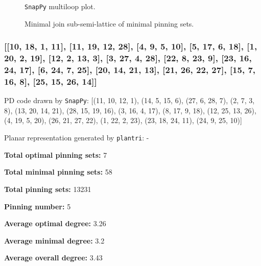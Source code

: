 \documentclass{article}%
\begin{document}
\begin{multicols}{2}
\begin{figure}[H]
\centering

\caption{\texttt{SnapPy} multiloop plot.}
\label{fig:tex/img/[[10, 18, 1, 11], [11, 19, 12, 28], [9, 27, 10, 28], [5, 17, 6, 18], [1, 6, 2, 7], [19, 7, 20, 8], [12, 8, 13, 9], [21, 26, 22, 27], [22, 4, 23, 5], [23, 16, 24, 17], [2, 24, 3, 25], [20, 14, 21, 13],.svg}
\end{figure}
\columnbreak

\begin{figure}[H]
\centering
\scalebox{0.8}{}
\caption{Minimal join sub-semi-lattice of minimal pinning sets.}
\label{fig:tex/img/[[10, 18, 1, 11], [11, 19, 12, 28], [9, 27, 10, 28], [5, 17, 6, 18], [1, 6, 2, 7], [19, 7, 20, 8], [12, 8, 13, 9], [21, 26, 22, 27], [22, 4, 23, 5], [23, 16, 24, 17], [2, 24, 3, 25], [20, 14, 21, 13],.pgf}
\end{figure}
\end{multicols}

\newpage

\subsubsection{[[10, 18, 1, 11], [11, 19, 12, 28], [4, 9, 5, 10], [5, 17, 6, 18], [1, 20, 2, 19], [12, 2, 13, 3], [3, 27, 4, 28], [22, 8, 23, 9], [23, 16, 24, 17], [6, 24, 7, 25], [20, 14, 21, 13], [21, 26, 22, 27], [15, 7, 16, 8], [25, 15, 26, 14]]}

{\small\noindent PD code drawn by \texttt{SnapPy}: [(11, 10, 12, 1), (14, 5, 15, 6), (27, 6, 28, 7), (2, 7, 3, 8), (13, 20, 14, 21), (28, 15, 19, 16), (3, 16, 4, 17), (8, 17, 9, 18), (12, 25, 13, 26), (4, 19, 5, 20), (26, 21, 27, 22), (1, 22, 2, 23), (23, 18, 24, 11), (24, 9, 25, 10)]}

{\small\noindent Planar representation generated by \texttt{plantri}: -}

\begin{multicols}{2}
{\normalsize \noindent\textbf{Total optimal pinning sets:} 7

\noindent\textbf{Total minimal pinning sets:} 58

\noindent\textbf{Total pinning sets:} 13231

\noindent\textbf{Pinning number:} 5

}
\columnbreak

{\normalsize \noindent\textbf{Average optimal degree:} 3.26

\noindent\textbf{Average minimal degree:} 3.2

\noindent\textbf{Average overall degree:} 3.43

}
\end{multicols}
\end{document}
